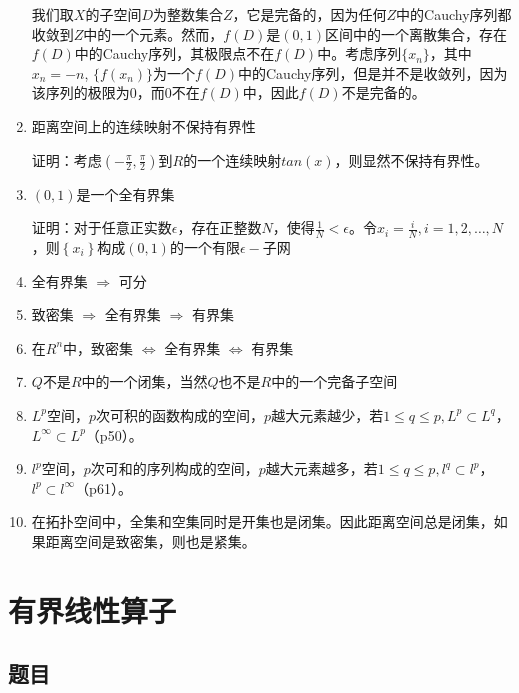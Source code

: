 \documentclass{article}
\begin{document}
\begin{enumerate}
我们取$X$的子空间$D$为整数集合$Z$，它是完备的，因为任何$Z$中的Cauchy序列都收敛到$Z$中的一个元素。然而，$f(D)$是$(0,1)$区间中的一个离散集合，存在$f(D)$中的Cauchy序列，其极限点不在$f(D)$中。考虑序列$\{x_n\}$，其中$x_n = -n$, $\{f(x_n)\}$为一个$f(D)$中的Cauchy序列，但是并不是收敛列，因为该序列的极限为0，而0不在$f(D)$中，因此$f(D)$不是完备的。

\item 距离空间上的连续映射不保持有界性

证明：考虑$(-\frac{\pi}{2}, \frac{\pi}{2})$到$R$的一个连续映射$tan(x)$，则显然不保持有界性。

\item $(0, 1)$是一个全有界集

证明：对于任意正实数$\epsilon$，存在正整数$N$，使得$\frac{1}{N} < \epsilon$。令$x_i=\frac{i}{N}, i=1,2,\dots,N$，则$\left\{x_i\right\}$构成$(0, 1)$的一个有限$\epsilon-$子网

\item 全有界集 $\Rightarrow$ 可分

\item 致密集 $\Rightarrow$ 全有界集 $\Rightarrow$ 有界集

\item 在$R^n$中，致密集 $\Leftrightarrow$ 全有界集 $\Leftrightarrow$ 有界集

\item $Q$不是$R$中的一个闭集，当然$Q$也不是$R$中的一个完备子空间

\item $L^p$空间，$p$次可积的函数构成的空间，$p$越大元素越少，$若1\leq q\leq p, L^p \subset L^q$，$L^{\infty} \subset L^p$（p50）。

\item $l^p$空间，$p$次可和的序列构成的空间，$p$越大元素越多，$若1\leq q\leq p, l^q \subset l^p$，$l^p \subset l^{\infty}$（p61）。

\item 在拓扑空间中，全集和空集同时是开集也是闭集。因此距离空间总是闭集，如果距离空间是致密集，则也是紧集。

\end{enumerate}

\section{有界线性算子}
\subsection{题目}
\end{document}
